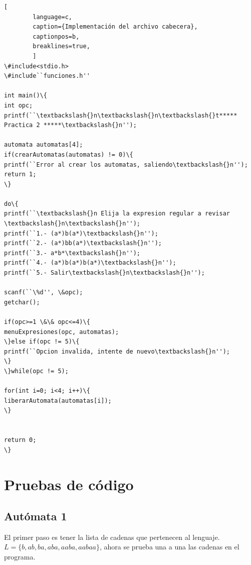 \documentclass[letterpaper,11pt,twoside]{article}
\begin{document}
	\begin{lstlisting}[
		language=c,
		caption={Implementación del archivo cabecera},
		captionpos=b,
		breaklines=true,		
		]
\#include<stdio.h>
\#include``funciones.h''

int main()\{
int opc;
printf(``\textbackslash{}n\textbackslash{}n\textbackslash{}t***** Practica 2 *****\textbackslash{}n'');

automata automatas[4];
if(crearAutomatas(automatas) != 0)\{
printf(``Error al crear los automatas, saliendo\textbackslash{}n'');
return 1;
\}

do\{
printf(``\textbackslash{}n Elija la expresion regular a revisar \textbackslash{}n\textbackslash{}n'');
printf(``1.- (a*)b(a*)\textbackslash{}n'');
printf(``2.- (a*)bb(a*)\textbackslash{}n'');
printf(``3.- a*b*\textbackslash{}n'');
printf(``4.- (a*)b(a*)b(a*)\textbackslash{}n'');
printf(``5.- Salir\textbackslash{}n\textbackslash{}n'');

scanf(``\%d'', \&opc);
getchar();

if(opc>=1 \&\& opc<=4)\{
menuExpresiones(opc, automatas);
\}else if(opc != 5)\{
printf(``Opcion invalida, intente de nuevo\textbackslash{}n'');
\}
\}while(opc != 5);

for(int i=0; i<4; i++)\{
liberarAutomata(automatas[i]);
\}


return 0;
\}
	\end{lstlisting}
	
	\newpage
	
	\section*{Pruebas de código}

	\subsection*{Autómata 1}
	El primer paso es tener la lista de cadenas que pertenecen al lenguaje. $L=\{b,ab,ba,aba,aaba,aabaa\}$, ahora se prueba una a una las cadenas en el programa.
\end{document}
